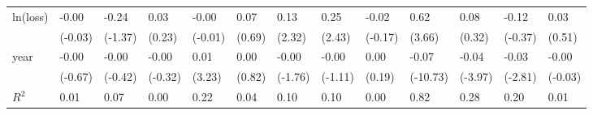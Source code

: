 \begin{tabular}{p{1.5cm} p{1.7cm} p{1.7cm} p{1.7cm}  p{1.7cm} p{1.7cm} p{1.7cm} p{1.7cm} p{1.7cm}  p{1.7cm} p{1.7cm} p{1.7cm} p{1.7cm} }
\hline
ln(loss)        &    -0.00         &    -0.24         &     0.03         &    -0.00         &     0.07         &     0.13\sym{*}  &     0.25\sym{*}  &    -0.02         &     0.62\sym{**} &     0.08         &    -0.12         &     0.03         \\
                &  (-0.03)         &  (-1.37)         &   (0.23)         &  (-0.01)         &   (0.69)         &   (2.32)         &   (2.43)         &  (-0.17)         &   (3.66)         &   (0.32)         &  (-0.37)         &   (0.51)         \\
year            &    -0.00         &    -0.00         &    -0.00         &     0.01\sym{**} &     0.00         &    -0.00         &    -0.00         &     0.00         &    -0.07\sym{***}&    -0.04\sym{***}&    -0.03\sym{**} &    -0.00         \\
                &  (-0.67)         &  (-0.42)         &  (-0.32)         &   (3.23)         &   (0.82)         &  (-1.76)         &  (-1.11)         &   (0.19)         & (-10.73)         &  (-3.97)         &  (-2.81)         &  (-0.03)         \\
\hline
\(R^{2}\)       &     0.01         &     0.07         &     0.00         &     0.22         &     0.04         &     0.10         &     0.10         &     0.00         &     0.82         &     0.28         &     0.20         &     0.01         \\
\end{tabular}
\def\sym#1{\ifmmode^{#1}\else\(^{#1}\)\fi}
